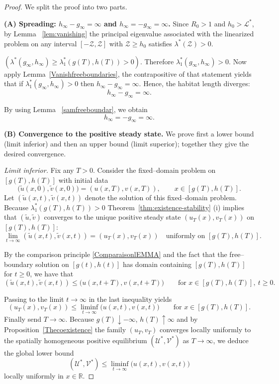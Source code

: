 \documentclass[a4paper,11pt]{amsart}
\theoremstyle{definition}
\numberwithin{equation}{section}
\theoremstyle{definition}
\begin{document}
\begin{proof}
We split the proof into two parts.

\medskip\noindent\textbf{(A) Spreading: $h_\infty-g_\infty=\infty$ and $h_\infty=-g_\infty=\infty$.}
Since \(R_0>1\) and \(h_0>\mathcal L^\ast\), by Lemma~ \eqref{lem:vanishing} the principal eigenvalue associated with the linearized problem on any interval \([-\mathcal{Z}, \mathcal{Z}]\) with \(\mathcal{Z} \geq h_0\) satisfies \(\lambda^\ast(\mathcal{Z})>0\).

$(\lambda^\ast(g_\infty,h_\infty) \geq \lambda^\ast_1(g(T),h(T)) > 0)$. Therefore $\lambda^\ast_1(g_\infty,h_\infty) > 0$.
Now apply Lemma~\eqref{Vanishfreeboundaries}, the contrapositive of that statement yields that if \(\lambda^\ast_1(g_\infty,h_\infty)>0\) then \(h_\infty-g_\infty=\infty\). Hence, the habitat length diverges:
\[
h_\infty-g_\infty=\infty.
\]

By using Lemma ~\eqref{samfreeboundar}, we obtain
\[
h_\infty=-g_\infty=\infty.
\]

\medskip\noindent\textbf{(B) Convergence to the positive steady state.}
We prove first a lower bound (limit inferior) and then an upper bound (limit superior); together they give the desired convergence.

\emph{Limit inferior.} Fix any \(T>0\). Consider the fixed–domain problem on \([g(T),h(T)]\) with initial data
\[
\big(\tilde u(x,0),\tilde v(x,0)\big)=(u(x,T),v(x,T)),\qquad x\in[g(T),h(T)].
\]
Let \((\tilde u(x,t),\tilde v(x,t))\) denote the solution of this fixed–domain problem. Because \(\lambda_1^\ast(g(T),h(T))>0\) Theorem~\eqref{thm:existence-stability} (i) implies that \((\tilde u,\tilde v)\) converges to the unique positive steady state \((u_{T}(x),v_{T}(x))\) on \([g(T),h(T)]\):
\[
\lim_{t\to\infty}(\tilde u(x,t),\tilde v(x,t))=(u_T(x),v_T(x))\quad\text{uniformly on }[g(T),h(T)].
\]

By the comparison principle \eqref{ComparaisonlEMMA} and the fact that the free–boundary solution on \([g(t),h(t)]\) has domain containing \([g(T),h(T)]\) for \(t\geq0\), we have that
\[
(\tilde u(x,t),\tilde v(x,t)) \leq \bigl(u(x,t+T),v(x,t+T)\bigr)\qquad\text{for }x\in[g(T),h(T)],\ t\geq0.
\]


Passing to the limit \(t\to\infty\) in the last inequality yields
\[
(u_T(x),v_T(x)) \leq \liminf_{t\to\infty}\bigl(u(x,t),v(x,t)\bigr)
\qquad\text{for }x\in[g(T),h(T)].
\]
    Finally send \(T\to\infty\). Because \(g(T)\downarrow -\infty\), \(h(T)\uparrow\infty\) and by Proposition~\eqref{Thecoexistence} the family \((u_T,v_T)\) converges locally uniformly to the spatially homogeneous positive equilibrium \((\mathscr U^\ast,\mathscr V^\ast)\) as \(T\to\infty\), we deduce the global lower bound
\[
(\mathscr U^\ast,\mathscr V^\ast) \leq \liminf_{t\to\infty}\bigl(u(x,t),v(x,t)\bigr)
\]
locally uniformly in \(x\in\mathbb R\).


\end{proof}
\end{document}
